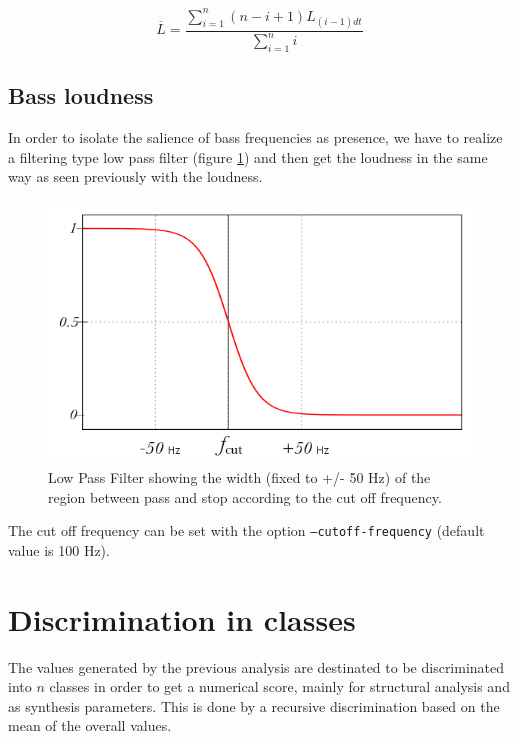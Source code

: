 \begin{equation}
\overline{L}=\frac{\displaystyle \sum_{i=1}^{n}(n-i+1)L_{(i-1)dt}}{\displaystyle \sum_{i=1}^{n}i} \nonumber
\end{equation}

\subsection{Bass loudness}

In order to isolate the salience of bass frequencies as presence, we have to realize a filtering type low pass filter (figure \ref{fig:lpf}) and then get the loudness in the same way as seen previously with the loudness.

\begin{figure}[!hbt]
	\begin{center}
		\includegraphics[scale=0.4]{img/4309}
		\caption{Low Pass Filter showing the width (fixed to +/- 50 Hz) of the region between pass and stop according to the cut off frequency.}
		\label{fig:lpf}
	\end{center}
\end{figure}

The cut off frequency can be set with the option \texttt{--cutoff-frequency} (default value is 100 Hz).

\section{Discrimination in classes}
\label{enk:dic}

The values generated by the previous analysis are destinated to be discriminated into $n$ classes in order to get a numerical score, mainly for structural analysis and as synthesis parameters.
This is done by a recursive discrimination based on the mean of the overall values.

